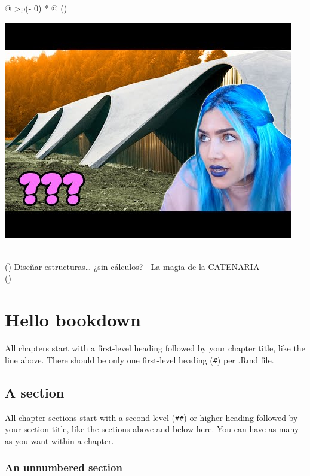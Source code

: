 \documentclass[
]{book}
\theoremstyle{definition}
\theoremstyle{definition}
\theoremstyle{definition}
\theoremstyle{definition}
\theoremstyle{remark}
\begin{document}
\begin{longtable}[]{@{}
  >{\centering\arraybackslash}p{(\columnwidth - 0\tabcolsep) * }@{}}
\toprule()
\begin{minipage}[b]{\linewidth}\centering
\includegraphics{./0.jpg}
\end{minipage} \\
\midrule()
\endhead
\href{https://youtu.be/KXP_kPPc7LY}{Diseñar estructuras\ldots{} ¿sin cálculos? 🤔 La magia de la CATENARIA} \\
\bottomrule()
\end{longtable}

\hypertarget{hello-bookdown}{%
\chapter{Hello bookdown}\label{hello-bookdown}}

All chapters start with a first-level heading followed by your chapter title, like the line above. There should be only one first-level heading (\texttt{\#}) per .Rmd file.

\hypertarget{a-section}{%
\section{A section}\label{a-section}}

All chapter sections start with a second-level (\texttt{\#\#}) or higher heading followed by your section title, like the sections above and below here. You can have as many as you want within a chapter.

\hypertarget{an-unnumbered-section}{%
\subsection*{An unnumbered section}\label{an-unnumbered-section}}
\end{document}
